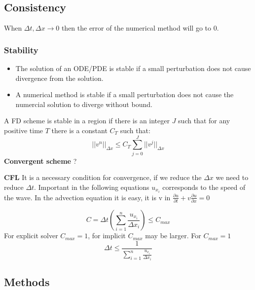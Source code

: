 \documentclass[doc]{apa}
\begin{document}
\subsection{Consistency}

When $\Delta t, \Delta x \rightarrow 0$ then the error of the numerical method will go to 0. \\

\subsubsection{Stability} 

\begin{itemize}
    \item The solution of an ODE/PDE is stable if a small perturbation does not cause divergence from the solution. 
    \item A numerical method is stable if a small perturbation does not cause the numercial
    solution to diverge without bound.
\end{itemize}

A FD scheme is stable in a region if there is an integer $J$ such that for any positive time $T$
there is a constant $C_T$ such that:
\begin{equation}
||v^n||_{\Delta x} \leq C_T \sum_{j=0}^J ||v^j||_{\Delta x}
\end{equation}
\textbf{Convergent scheme} ?

\textbf{CFL} It is a necessary condition for convergence, if we reduce the $\Delta x$ we need to reduce $\Delta t$.
{\color{red} Important} in the following equations $u_{x_i}$ corresponds
to the speed of the wave. In the advection equation it is
easy, it is v in $ \frac{ \partial u}{ \partial t} + v\frac{\partial u}{\partial x} = 0 $ 

\begin{equation}
C = \Delta t \left (\sum _{i=1}^n \frac{u_{x_i}}{\Delta x_i} \right ) \leq C_{max}
\end{equation}
For explicit solver $C_{max} = 1$, for implicit $C_{max}$ may be larger.  For $C_{max} = 1$
\begin{equation}
\Delta t \leq \frac{1}{\sum _{i=1}^n \frac{u_{x_i}}{\Delta x_i} }
\end{equation}

\subsection{Methods}
\end{document}
